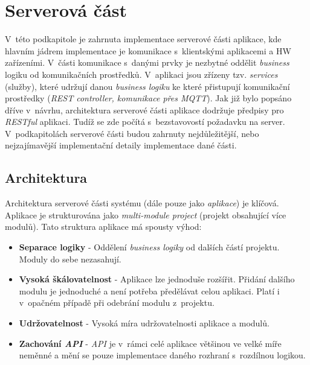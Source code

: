 \section{Serverová část}
\label{impl:backend}
V~této podkapitole je zahrnuta implementace serverové části aplikace, kde hlavním jádrem implementace je komunikace s~klientskými aplikacemi a HW zařízeními.
V~části komunikace s~danými prvky je nezbytné oddělit \emph{business} logiku od komunikačních prostředků.
V~aplikaci jsou zřízeny tzv. \emph{services} (služby), které udržují danou \emph{business logiku} ke které přistupují komunikační prostředky (\emph{REST controller, komunikace přes MQTT}).
Jak již bylo popsáno dříve v~návrhu, architektura serverové části aplikace dodržuje předpisy pro \emph{RESTful} aplikaci.
Tudíž se zde počítá s~bezstavovostí požadavku na server.
V~podkapitolách serverové části budou zahrnuty nejdůležitější, nebo nejzajímavější implementační detaily implementace dané části.

\subsection*{Architektura}
\label{impl:backend:architektura}
Architektura serverové části systému (dále pouze jako \emph{aplikace}) je klíčová.
Aplikace je strukturována jako \emph{multi-module project} (projekt obsahující více modulů).
\newline
Tato struktura aplikace má spousty výhod:
\begin{itemize}
  \item \textbf{Separace logiky} - Oddělení \emph{business logiky} od dalších částí projektu. Moduly do sebe nezasahují.
  \item \textbf{Vysoká škálovatelnost} - Aplikace lze jednoduše rozšířit. Přidání dalšího modulu je jednoduché a není potřeba předělávat celou aplikaci. Platí i v~opačném případě při odebrání modulu z~projektu.
  \item \textbf{Udržovatelnost} - Vysoká míra udržovatelnosti aplikace a modulů.
  \item \textbf{Zachování \emph{API}} - \emph{API} je v~rámci celé aplikace většinou ve velké míře neměnné a mění se pouze implementace daného rozhraní s~rozdílnou logikou.
\end{itemize}

